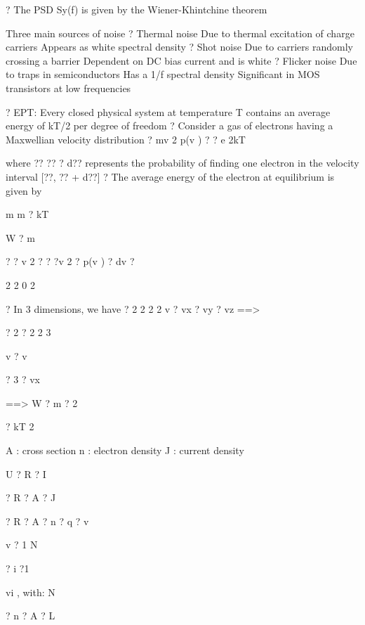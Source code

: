 \documentclass[2pt,landscape]{article}
\begin{document}
\begin{multicols*}{5}
?	The PSD Sy(f) is given by the Wiener-Khintchine theorem













Three main sources of noise
?	Thermal noise
\textbullet 	Due to thermal excitation of charge carriers
\textbullet 	Appears as white spectral density
?	Shot noise
\textbullet 	Due to carriers randomly crossing a barrier
\textbullet 	Dependent on DC bias current and is white
?	Flicker noise
\textbullet 	Due to traps in semiconductors
\textbullet 	Has a 1/f spectral density
\textbullet 	Significant in MOS transistors at low frequencies



?	EPT: Every closed physical system at temperature T contains an average 
energy of kT/2 per degree of freedom
?	Consider a gas of electrons having a Maxwellian velocity distribution
? mv 2
p(v ) ?	? e 2kT

where ?? ??	? d?? represents the probability of finding one electron in the velocity 
interval [??, ?? + d??]
?	The average energy of the electron at equilibrium is given by

m	m ?	kT


W ?	m


?	? v 2	?	? ?v 2 ? 
p(v ) ? dv ?


2	2	0	2

?	In 3 dimensions, we have
? 2	2	2	2
v	? vx ? vy ? vz ==>

? 2	? 2	2	3



v	?	v


? 3 ? vx


==> W ? m ?
2


?	kT 	
2




A :	cross section
n :	electron density
J :	current density


U ? R ? I


? R ? A ? J


? R ? A ? n ? q ? v





v	? 1
N




?
i ?1


vi ,	with: N


? n ? A ? L




\end{multicols*}
\end{document}

